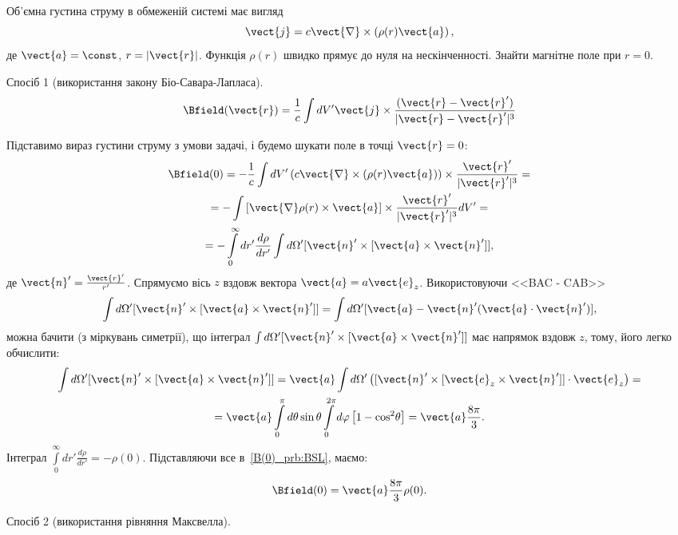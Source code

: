 \begin{problem}
Об'ємна густина струму в обмеженій системі має вигляд
\[
	\vect{j} = c\vect{\nabla}\times \left( \rho(r) \vect{a}\right),
\]
де $\vect{a} = \const$, $r = |\vect{r}|$.  Функція $\rho(r)$  швидко прямує до нуля на нескінченності. Знайти магнітне поле при  $r = 0$.
\begin{solution}
	Спосіб 1 (використання закону Біо-Савара-Лапласа).
	\[
		\Bfield(\vect{r}) = \frac1c \int dV' \vect{j} \times \frac{(\vect{r} - \vect{r}')}{|\vect{r} - \vect{r}'|^3}
	\]

	Підставимо вираз густини струму з умови задачі, і будемо шукати поле в точці $\vect{r} = 0$:
	\begin{multline}\label{B(0)_prb:BSL}
		\Bfield(0) = -\frac1c \int dV' \left( c\vect{\nabla}\times \left( \rho(r) \vect{a}\right) \right) \times \frac{\vect{r}'}{|\vect{r}'|^3} = \\
		= -\int \left[ \vect{\nabla}\rho(r)\times\vect{a} \right] \times \frac{\vect{r}'}{|\vect{r}'|^3} dV' = \\
		= -\int\limits_0^{\infty} dr'\frac{d\rho}{dr'} \int d\Omega' [{\vect{n}}' \times [{\vect{a}} \times {\vect{n}}']],
	\end{multline}
	де $\vect{n}' = \frac{\vect{r}'}{r'}$. Спрямуємо вісь $z$ вздовж вектора  $\vect{a} = a\vect{e}_z$. Використовуючи <<BAC - CAB>>
	\[
		\int {d\Omega'} [{\vect{n}}' \times [{\vect{a}} \times {\vect{n}}']] = \int {d\Omega'} [\vect{a} - \vect{n}'(\vect{a} \cdot {\vect{n}}')],
	\]
	можна бачити (з міркувань симетрії), що
    інтеграл  $\int {d\Omega'} [{\vect{n}}' \times [{\vect{a}} \times {\vect{n}}']] $ має напрямок вздовж $z$, тому, його легко обчислити:
	\begin{multline}
		\int d\Omega' [{\vect{n}}' \times [{\vect{a}} \times {\vect{n}}']] = {\vect{a}}\int {d\Omega'} \left( {[{\vect{n}}' \times [{{\vect{e}}_z} \times {\vect{n}}']] \cdot {{\vect{e}}_z}} \right) = \\
		= \vect{a}\int\limits_0^\pi  {d\theta } \sin \theta \int\limits_0^{2\pi } {d\varphi } \left[ {1 - {\cos^2}\theta } \right] = \vect{a}\frac{8\pi}{3}.
	\end{multline}
	Інтеграл $\int\limits_0^{\infty} dr'\frac{d\rho}{dr'} = -\rho(0)$.
	Підставляючи все в~\eqref{B(0)_prb:BSL}, маємо:
	\[
		\Bfield(0) = \vect{a}\frac{8\pi}{3}\rho(0).
	\]

	Спосіб 2 (використання рівняння Максвелла).


\end{solution}
\end{problem}
